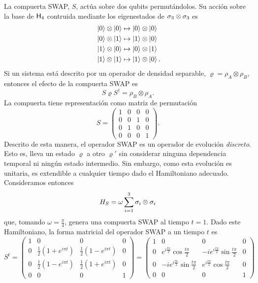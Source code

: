La compuerta SWAP, $S$, actúa sobre dos qubits permutándolos. Su acción sobre la base de ${\sf H}_{4}$ contruida mediante los eigenestados de $\sigma_{3}\otimes\sigma_{3}$ es
\begin{align*}
    \ket{0}\otimes\ket{0}&\mapsto\ket{0}\otimes\ket{0}\\
    \ket{0}\otimes\ket{1}&\mapsto\ket{1}\otimes\ket{0}\\
    \ket{1}\otimes\ket{0}&\mapsto\ket{0}\otimes\ket{1}\\
    \ket{1}\otimes\ket{1}&\mapsto\ket{1}\otimes\ket{0} \rlap{.}
\end{align*}
Si un sistema está descrito por un operador de densidad separable, $\varrho=\rho_{A}\otimes\rho_{B}$, entonces el efecto de la compuerta SWAP es 
\begin{equation*}
    S\varrho S^{\dag}=\rho_{B}\otimes\rho_{A}.
\end{equation*}
La compuerta tiene representación como matriz de permutación
\begin{equation*}
    S=\begin{pmatrix}
        1&0&0&0\\
        0&0&1&0\\
        0&1&0&0\\
        0&0&0&1
    \end{pmatrix}.
\end{equation*}
Descrito de esta manera, el operador SWAP es un operador de evolución \textit{discreto}. Esto es, lleva un estado $\varrho$ a otro $\varrho'$ sin considerar ninguna dependencia temporal ni ningún estado intermedio. Sin embargo, como esta evolución es unitaria, es extendible a cualquier tiempo dado el Hamiltoniano adecuado. Consideramos entonces
\begin{equation*}
  H_{S}=\omega\sum_{i=1}^{3}\sigma_{i}\otimes\sigma_{i}
\end{equation*}
que, tomando $\omega=\frac{\pi}{4}$, genera una compuerta SWAP al tiempo $t=1$. Dado este Hamiltoniano, la forma matricial del operador \textsc{SWAP} a un tiempo $t$ es
\begin{equation}\label{eq:SWAP(t)}
S^{t}=\begin{pmatrix}
 1 & 0 & 0 & 0 \\
 0 & \frac{1}{2}(1+e^{i \pi t}) & \frac{1}{2} (1-e^{i \pi t}) & 0 \\
 0 & \frac{1}{2}(1-e^{i \pi t}) & \frac{1}{2}(1+e^{i \pi t}) & 0 \\
 0 & 0 & 0 & 1
\end{pmatrix}=\begin{pmatrix}
  1 & 0 & 0 & 0 \\
  0 & e^{i\frac{t\pi}{2}}\cos{\frac{t\pi}{2}} & -ie^{i\frac{t\pi}{2}}\sin{\frac{t\pi}{2}} & 0 \\
  0 & -ie^{i\frac{t\pi}{2}}\sin{\frac{t\pi}{2}} & e^{i\frac{t\pi}{2}}\cos{\frac{t\pi}{2}}  & 0 \\
  0 & 0 & 0 & 1
 \end{pmatrix}
\end{equation}

